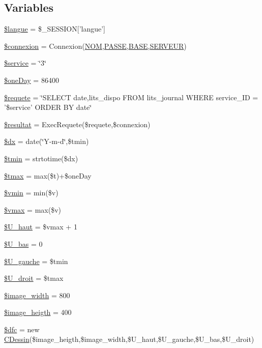 \subsection*{Variables}
\begin{CompactItemize}
\item 
\hyperlink{synoptique__tendances_8php_a0}{\$langue} = \$\_\-SESSION\mbox{[}'langue'\mbox{]}
\item 
\hyperlink{synoptique__tendances_8php_a1}{\$connexion} = Connexion(\hyperlink{pma__connect_8php_a0}{NOM},\hyperlink{pma__connect_8php_a1}{PASSE},\hyperlink{pma__connect_8php_a3}{BASE},\hyperlink{pma__connect_8php_a2}{SERVEUR})
\item 
\hyperlink{synoptique__tendances_8php_a2}{\$service} = \char`\"{}3\char`\"{}
\item 
\hyperlink{synoptique__tendances_8php_a3}{\$one\-Day} = 86400
\item 
\hyperlink{synoptique__tendances_8php_a4}{\$requete} = \char`\"{}SELECT date,lits\_\-dispo FROM lits\_\-journal WHERE service\_\-ID = '\$service' ORDER BY date\char`\"{}
\item 
\hyperlink{synoptique__tendances_8php_a5}{\$resultat} = Exec\-Requete(\$requete,\$connexion)
\item 
\hyperlink{synoptique__tendances_8php_a6}{\$dx} = date(\char`\"{}Y-m-d\char`\"{},\$tmin)
\item 
\hyperlink{synoptique__tendances_8php_a7}{\$tmin} = strtotime(\$dx)
\item 
\hyperlink{synoptique__tendances_8php_a8}{\$tmax} = max(\$t)+\$one\-Day
\item 
\hyperlink{synoptique__tendances_8php_a9}{\$vmin} = min(\$v)
\item 
\hyperlink{synoptique__tendances_8php_a10}{\$vmax} = max(\$v)
\item 
\hyperlink{synoptique__tendances_8php_a11}{\$U\_\-haut} = \$vmax + 1
\item 
\hyperlink{synoptique__tendances_8php_a12}{\$U\_\-bas} = 0
\item 
\hyperlink{synoptique__tendances_8php_a13}{\$U\_\-gauche} = \$tmin
\item 
\hyperlink{synoptique__tendances_8php_a14}{\$U\_\-droit} = \$tmax
\item 
\hyperlink{synoptique__tendances_8php_a15}{\$image\_\-width} = 800
\item 
\hyperlink{synoptique__tendances_8php_a16}{\$image\_\-heigth} = 400
\item 
\hyperlink{synoptique__tendances_8php_a17}{\$dfc} = new \hyperlink{classCDessin}{CDessin}(\$image\_\-heigth,\$image\_\-width,\$U\_\-haut,\$U\_\-gauche,\$U\_\-bas,\$U\_\-droit)

\end{CompactItemize}
